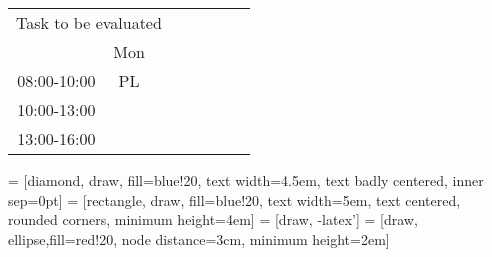 \begin{table}[!h]
\begin{tabular}{cccccccc}
\multicolumn{3}{c}{Task to be evaluated}                                                                    &                                                &                        &                                                &                        &                        \\
                                 & Mon                                             &                        &                                                &                        &                                                &                        &                        \\ \cline{2-2}
\multicolumn{1}{c|}{08:00-10:00} & \multicolumn{1}{c|}{\cellcolor[HTML]{FCFF2F}PL} &                        &                                                &                        &                                                &                        &                        \\ \cline{2-2}
\multicolumn{1}{c|}{10:00-13:00} & \multicolumn{1}{c|}{\cellcolor[HTML]{FCFF2F}}   &                        &                                                &                        &                                                &                        &                        \\ \cline{2-2}
\multicolumn{1}{c|}{13:00-16:00} & \multicolumn{1}{c|}{\cellcolor[HTML]{FCFF2F}}   &                        &                                                &                        &                                                &                        &                        \\ \cline{2-2}
\end{tabular}
\end{table}


 = [diamond, draw, fill=blue!20, 
    text width=4.5em, text badly centered, inner sep=0pt]
 = [rectangle, draw, fill=blue!20, 
    text width=5em, text centered, rounded corners, minimum height=4em]
 = [draw, -latex']
 = [draw, ellipse,fill=red!20, node distance=3cm,
    minimum height=2em]

